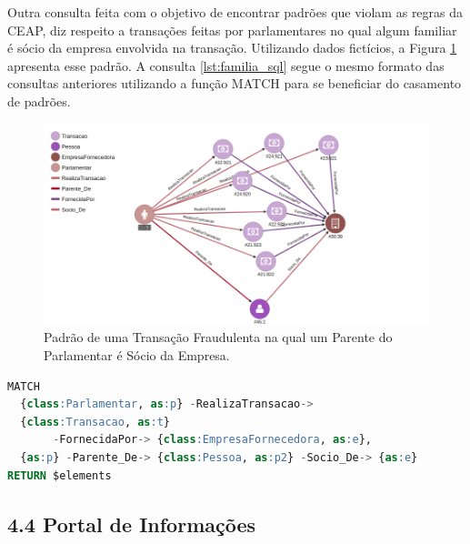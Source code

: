 \documentclass[12pt]{article}
\begin{document}
Outra consulta feita com o objetivo de encontrar padrões que violam as regras da CEAP, diz respeito a transações feitas por parlamentares no qual algum familiar é sócio da empresa envolvida na transação. Utilizando dados fictícios, a Figura \ref{fig:familia_socio} apresenta esse padrão. A consulta \ref{lst:familia_sql} segue o mesmo formato das consultas anteriores utilizando a função MATCH para se beneficiar do casamento de padrões.

\begin{figure}[ht]
\centering
\includegraphics[width=.85\textwidth]{familia_socio}
\caption{Padrão de uma Transação Fraudulenta na qual um Parente do Parlamentar é Sócio da Empresa.}
\label{fig:familia_socio}
\end{figure}

\begin{lstlisting}[label={lst:familia_sql}, caption={Consulta de Relacionamento de Uso da CEAP entre Deputados e Empresas, em que um Parente do Deputado é Sócio da Empresa.},captionpos=b, language=sql]
MATCH 
  {class:Parlamentar, as:p} -RealizaTransacao-> 
  {class:Transacao, as:t} 
       -FornecidaPor-> {class:EmpresaFornecedora, as:e},
  {as:p} -Parente_De-> {class:Pessoa, as:p2} -Socio_De-> {as:e}
RETURN $elements
\end{lstlisting}

\subsection{4.4 Portal de Informações} \label{sec:portal info}




\end{document}
